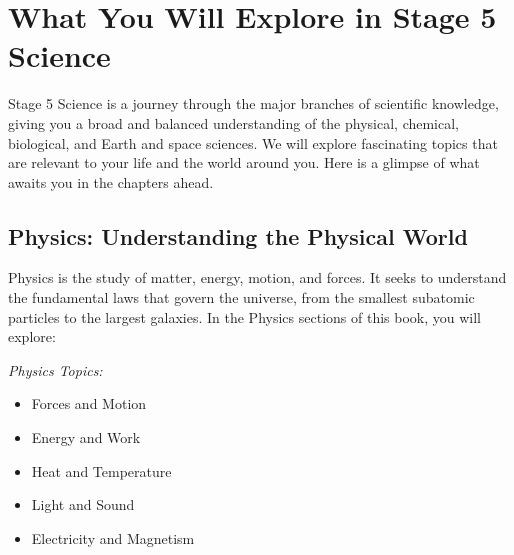 \FloatBarrier

\section{What You Will Explore in Stage 5 Science}

Stage 5 Science is a journey through the major branches of scientific knowledge, giving you a broad and balanced understanding of the physical, chemical, biological, and Earth and space sciences.  We will explore fascinating topics that are relevant to your life and the world around you.  Here is a glimpse of what awaits you in the chapters ahead.

\subsection{Physics: Understanding the Physical World}

Physics is the study of matter, energy, motion, and forces.  It seeks to understand the fundamental laws that govern the universe, from the smallest subatomic particles to the largest galaxies.  In the Physics sections of this book, you will explore:

\begin{marginnote}
\textit{Physics Topics:}
\begin{itemize}
    \item Forces and Motion
    \item Energy and Work
    \item Heat and Temperature
    \item Light and Sound
    \item Electricity and Magnetism
\end{itemize}
\end{marginnote}

